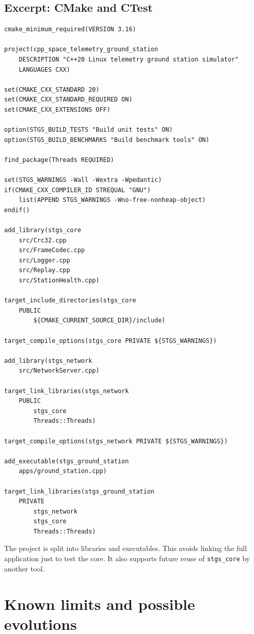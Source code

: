 \documentclass[10pt,a4paper]{article}
\begin{document}
\subsection{Excerpt: CMake and CTest}
\begin{lstlisting}[caption={CMake structure: libraries, executables, tests, benchmarks}]
cmake_minimum_required(VERSION 3.16)

project(cpp_space_telemetry_ground_station
    DESCRIPTION "C++20 Linux telemetry ground station simulator"
    LANGUAGES CXX)

set(CMAKE_CXX_STANDARD 20)
set(CMAKE_CXX_STANDARD_REQUIRED ON)
set(CMAKE_CXX_EXTENSIONS OFF)

option(STGS_BUILD_TESTS "Build unit tests" ON)
option(STGS_BUILD_BENCHMARKS "Build benchmark tools" ON)

find_package(Threads REQUIRED)

set(STGS_WARNINGS -Wall -Wextra -Wpedantic)
if(CMAKE_CXX_COMPILER_ID STREQUAL "GNU")
    list(APPEND STGS_WARNINGS -Wno-free-nonheap-object)
endif()

add_library(stgs_core
    src/Crc32.cpp
    src/FrameCodec.cpp
    src/Logger.cpp
    src/Replay.cpp
    src/StationHealth.cpp)

target_include_directories(stgs_core
    PUBLIC
        ${CMAKE_CURRENT_SOURCE_DIR}/include)

target_compile_options(stgs_core PRIVATE ${STGS_WARNINGS})

add_library(stgs_network
    src/NetworkServer.cpp)

target_link_libraries(stgs_network
    PUBLIC
        stgs_core
        Threads::Threads)

target_compile_options(stgs_network PRIVATE ${STGS_WARNINGS})

add_executable(stgs_ground_station
    apps/ground_station.cpp)

target_link_libraries(stgs_ground_station
    PRIVATE
        stgs_network
        stgs_core
        Threads::Threads)
\end{lstlisting}


The project is split into libraries and executables. This avoids linking the full application just to test the core. It also supports future reuse of \texttt{stgs\_core} by another tool.

\section{Known limits and possible evolutions}
\end{document}
